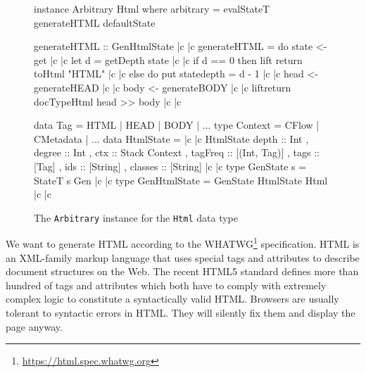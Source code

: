 \documentclass[sigconf]{acmart}
\begin{document}
\begin{figure}[t]
  \begin{haskell}
instance Arbitrary Html where
  arbitrary = evalStateT generateHTML defaultState

generateHTML :: GenHtmlState |c \label{ref.generateHTML.begin} |c
generateHTML = do
  state <- get |c \label{ref.generateHTML.getState} |c   
  let d = getDepth state |c \label{ref.generateHTML.getDepth} |c
  if d == 0
  then lift \dollar return \dollar toHtml "HTML" |c \label{ref.generateHTML.returnString} |c
  else do put state{depth = d - 1} |c \label{ref.generateHTML.updateState} |c
           head <- generateHEAD |c \label{ref.generateHTML.newHead} |c
           body <- generateBODY |c \label{ref.generateHTML.newBody} |c
           lift\dollar return \dollar docTypeHtml \dollar head >> body |c \label{ref.generateHTML.end} |c

data Tag = HTML | HEAD | BODY | ...
type Context = CFlow | CMetadata | ...
data HtmlState = |c \label{ref.HtmlState.begin} |c
  HtmlState { depth      :: Int 
             , degree    :: Int    
             , ctx       :: Stack Context 
             , tagFreq   :: [(Int, Tag)] 
             , tags      :: [Tag]
             , ids       :: [String]
             , classes   :: [String] } |c \label{ref.HtmlState.end} |c
type GenState s = StateT s Gen |c \label{ref.GenState} |c
type GenHtmlState = GenState HtmlState Html |c \label{ref.GenHtmlState} |c
  \end{haskell}
  \caption{The \texttt{Arbitrary} instance for the \texttt{Html} data type}
  \label{fig.html.arb.def}
\end{figure}

We want to generate HTML according to the WHATWG\footnote{\url{https://html.spec.whatwg.org}} specification. HTML is an XML-family markup language that uses special tags and attributes to describe document structures on the Web. The recent HTML5 standard defines more than hundred of tags and attributes which both have to comply with extremely complex logic to constitute a syntactically valid HTML. Browsers are usually tolerant to syntactic errors in HTML. They will silently fix them and display the page anyway.
\end{document}
